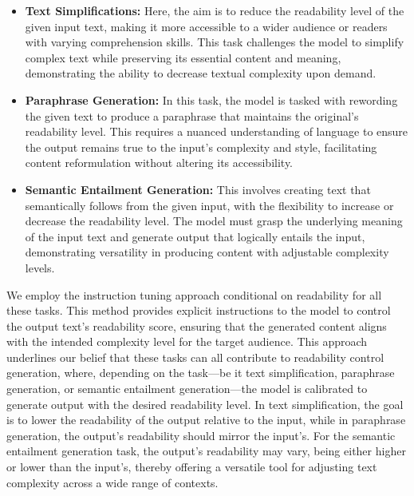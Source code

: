 \documentclass[11pt]{article}
\begin{document}
\begin{itemize}
[leftmargin=.1in,topsep=0.3pt]
\setlength\itemsep{0em}
\vspace{-0.2em}
    \item \textbf{Text Simplifications:} Here, the aim is to reduce the readability level of the given input text, making it more accessible to a wider audience or readers with varying comprehension skills. This task challenges the model to simplify complex text while preserving its essential content and meaning, demonstrating the ability to decrease textual complexity upon demand.
        
    \item \textbf{Paraphrase Generation:} In this task, the model is tasked with rewording the given text to produce a paraphrase that maintains the original's readability level. This requires a nuanced understanding of language to ensure the output remains true to the input's complexity and style, facilitating content reformulation without altering its accessibility.
    
    \item \textbf{Semantic Entailment Generation:} This involves creating text that semantically follows from the given input, with the flexibility to increase or decrease the readability level. The model must grasp the underlying meaning of the input text and generate output that logically entails the input, demonstrating versatility in producing content with adjustable complexity levels.

\end{itemize}

We employ the instruction tuning approach conditional on readability for all these tasks. This method provides explicit instructions to the model to control the output text's readability score, ensuring that the generated content aligns with the intended complexity level for the target audience. This approach underlines our belief that these tasks can all contribute to readability control generation, where, depending on the task—be it text simplification, paraphrase generation, or semantic entailment generation—the model is calibrated to generate output with the desired readability level. In text simplification, the goal is to lower the readability of the output relative to the input, while in paraphrase generation, the output's readability should mirror the input's. For the semantic entailment generation task, the output's readability may vary, being either higher or lower than the input's, thereby offering a versatile tool for adjusting text complexity across a wide range of contexts.
\end{document}
